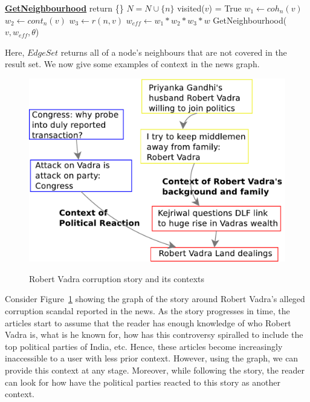 \begin{algorithmic}
  \State \textbf{\underline{GetNeighbourhood}}
  \State {}
  \State {}
      \State return \{\}
    \EndIf
    \State $N = N\cup\{n\}$
        \State visited($v$) = True
        \State $w_1 \leftarrow coh_{n}(v)$
        \State $w_2 \leftarrow cont_{n}(v)$
        \State $w_3 \leftarrow r(n,v)$
        \State $w_{eff} \leftarrow w_1 * w_2 * w_3 * w$
        \State GetNeighbourhood($v, w_{eff}, \theta$)
      \EndIf
    \EndFor
\end{algorithmic}

Here, $EdgeSet$ returns all of a node's neighbours that are not covered in the result set. We now give some examples of context in the news graph.
\begin{figure}
\caption{Robert Vadra corruption story and its contexts}
\includegraphics[scale=0.36]{figures/graph-vadra.pdf}
\label{fig:vadra-corruption}
\end{figure}

Consider Figure~\ref{fig:vadra-corruption} showing the graph of the story around Robert Vadra's alleged
corruption scandal reported in the news. As the story progresses in time, the articles
start to assume that the reader has enough knowledge of who Robert Vadra is, what is he known for,
how has this controversy spiralled to include the top political parties of India, etc. Hence, these articles
become increasingly inaccessible to a user with less prior context. However, 
using the graph, we can provide this context at any stage. Moreover, while following the story, 
the reader can look for how have the political parties reacted to this story as another context.

